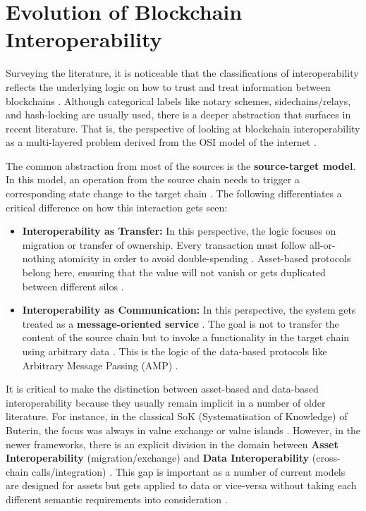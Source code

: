 \section{Evolution of Blockchain
Interoperability}\label{evolution-of-blockchain-interoperability}

Surveying the literature, it is noticeable that the classifications of
interoperability reflects the underlying logic on how to trust and treat
information between blockchains \citep{wang2021sok} \citep{Pillai_2022}
\citep{wang2023}. Although categorical labels like notary schemes,
sidechains/relays, and hash-locking are usually used, there is a deeper
abstraction that surfaces in recent literature. That is, the perspective
of looking at blockchain interoperability as a multi-layered problem
derived from the OSI model of the internet \citep{Hassan_2025}
\citep{deng2025}.

The common abstraction from most of the sources is the
\textbf{source-target model}. In this model, an operation from the
source chain needs to trigger a corresponding state change to the target
chain \citep{deng2025} \citep{Cheng_2024}. The following differentiates
a critical difference on how this interaction gets seen:

\begin{itemize}
\item
  \textbf{Interoperability as Transfer:} In this perspective, the logic
  focuses on migration or transfer of ownership. Every transaction must
  follow all-or-nothing atomicity in order to avoid double-spending
  \citep{wang2021sok} \citep{Llambas2024patterns} \citep{deng2025}.
  Asset-based protocols belong here, ensuring that the value will not
  vanish or gets duplicated between different silos
  \citep{Belchior_2023} \citep{wang2023}.
\item
  \textbf{Interoperability as Communication:} In this perspective, the
  system gets treated as a \textbf{message-oriented service}
  \citep{wang2021sok} \citep{Kotey_2023} \citep{kang2022}. The goal is
  not to transfer the content of the source chain but to invoke a
  functionality in the target chain using arbitrary data
  \citep{Pillai_2022} \citep{Belchior_2021}. This is the logic of the
  data-based protocols like Arbitrary Message Passing (AMP)
  \citep{augusto2025}.
\end{itemize}

It is critical to make the distinction between asset-based and
data-based interoperability because they usually remain implicit in a
number of older literature. For instance, in the classical SoK
(Systematisation of Knowledge) of Buterin, the focus was always in value
exchange or value islands \citep{wang2021sok} \citep{A_Alzahrani_2025}
\citep{Pillai_2022}. However, in the newer frameworks, there is an
explicit division in the domain between \textbf{Asset Interoperability}
(migration/exchange) and \textbf{Data Interoperability} (cross-chain
calls/integration) \citep{deng2025} \citep{Cheng_2024} \citep{Li2025}.
This gap is important as a number of current models are designed for
assets but gets applied to data or vice-versa without taking each
different semantic requirements into consideration \citep{Belchior_2023}
\citep{Li2025}.

